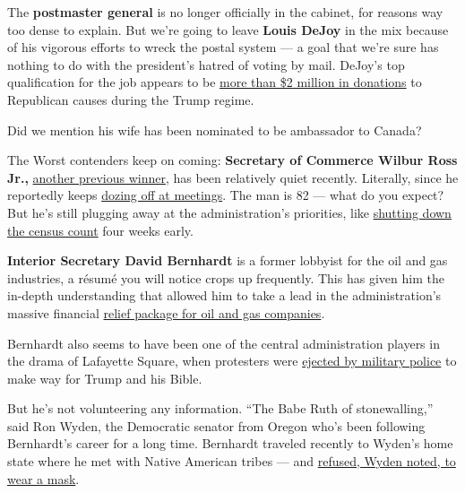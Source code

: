 The \textbf{postmaster general} is no longer officially in the cabinet,
for reasons way too dense to explain. But we're going to leave
\textbf{Louis DeJoy} in the mix because of his vigorous efforts to wreck
the postal system --- a goal that we're sure has nothing to do with the
president's hatred of voting by mail. DeJoy's top qualification for the
job appears to be
\href{https://www.washingtonpost.com/politics/top-republican-fundraiser-and-trump-ally-to-be-named-postmaster-general-giving-president-new-influence-over-postal-service-officials-say/2020/05/06/25cde93c-8fd4-11ea-8df0-ee33c3f5b0d6_story.html}{more
than \$2 million in donations} to Republican causes during the Trump
regime.

Did we mention his wife has been nominated to be ambassador to Canada?

The Worst contenders keep on coming: \textbf{Secretary of Commerce
Wilbur Ross Jr.,}
\href{https://www.nytimes.com/2019/02/06/opinion/trump-cabinet-wilbur-ross.html}{another
previous winner}, has been relatively quiet recently. Literally, since
he reportedly keeps
\href{https://www.vanityfair.com/news/2019/07/wilbur-ross-falling-asleep}{dozing
off at meetings}. The man is 82 --- what do you expect? But he's still
plugging away at the administration's priorities, like
\href{https://www.nytimes.com/2020/08/04/us/2020-census-ending-early.html}{shutting
down the census count} four weeks early.

\textbf{Interior Secretary David Bernhardt} is a former lobbyist for the
oil and gas industries, a résumé you will notice crops up frequently.
This has given him the in-depth understanding that allowed him to take a
lead in the administration's massive financial
\href{https://readsludge.com/2020/07/15/trump-admin-bails-out-oil-and-gas-companies-that-gave-millions-to-gop-groups/}{relief
package for oil and gas companies}.

Bernhardt also seems to have been one of the central administration
players in the drama of Lafayette Square, when protesters were
\href{https://www.nytimes.com/2020/06/01/us/floyd-protests-live.html}{ejected
by military police} to make way for Trump and his Bible.

But he's not volunteering any information. ``The Babe Ruth of
stonewalling,'' said Ron Wyden, the Democratic senator from Oregon who's
been following Bernhardt's career for a long time. Bernhardt traveled
recently to Wyden's home state where he met with Native American tribes
--- and
\href{https://thehill.com/policy/energy-environment/508803-democrats-bernhardt-refusing-mask-meeting-tribes-oregon}{refused,
Wyden noted, to wear a mask}.

